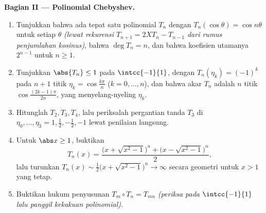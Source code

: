 \begin{problem}
\medskip
\noindent\textbf{Bagian II --- Polinomial Chebyshev.}
\begin{enumerate}[resume]
  \item Tunjukkan bahwa ada tepat satu polinomial $T_n$ dengan
        $T_n(\cos\theta) = \cos n\theta$ untuk setiap $\theta$
        \emph{(lewat rekurensi $T_{n+1} = 2XT_n - T_{n-1}$ dari
        rumus penjumlahan kosinus)}, bahwa $\deg T_n = n$, dan bahwa
        koefisien utamanya $2^{n-1}$ untuk $n \geq 1$.
  \item Tunjukkan $\abs{T_n} \leq 1$ pada $\intcc{-1}{1}$, dengan
        $T_n(\eta_k) = (-1)^k$ pada $n + 1$ titik $\eta_k =
        \cos\frac{k\pi}{n}$ ($k = 0, \dots, n$), dan bahwa
        akar $T_n$ adalah $n$ titik
        $\cos\frac{(2k-1)\pi}{2n}$, yang menyelang-nyeling $\eta_k$.
  \item Hitunglah $T_2, T_3, T_4$, lalu periksalah pergantian tanda
        $T_3$ di $\eta_0, \dots, \eta_3 = 1, \frac12, -\frac12,
        -1$ lewat penilaian langsung.
  \item Untuk $\abs x \geq 1$, buktikan
        \[
        T_n(x) = \frac{\bigl(x + \sqrt{x^2 - 1}\bigr)^n +
        \bigl(x - \sqrt{x^2 - 1}\bigr)^n}{2},
        \]
        lalu turunkan $T_n(x) \sim \frac12\bigl(x + \sqrt{x^2 -
        1}\bigr)^n \to \infty$ secara geometri untuk $x > 1$ yang tetap.
  \item Buktikan hukum penyusunan $T_m \circ T_n = T_{mn}$
        \emph{(periksa pada $\intcc{-1}{1}$ lalu panggil kekakuan
        polinomial)}.
\end{enumerate}


\end{problem}
